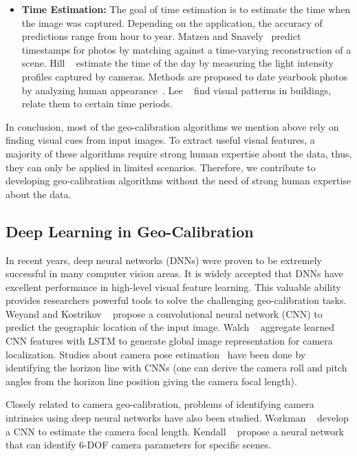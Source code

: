 \begin{itemize}[noitemsep]
\item \textbf{Time Estimation:}
The goal of time estimation is to estimate the time when the 
image was captured. Depending on the application, the accuracy of
predictions range from hour to year.
%
Matzen and Snavely~\cite{matzen2014scene} predict
timestamps for photos by matching against a time-varying
reconstruction of a scene.  Hill \etal~\cite{hill1994elephant} estimate the
time of the day by measuring the light intensity profiles captured by
cameras. Methods are proposed to date
yearbook photos by analyzing human
appearance~\cite{salem2016face2year,ginosar2015century}. Lee
\etal~\cite{linking2015iccp} find visual patterns in buildings,
relate them to certain time periods.
\newline

\end{itemize}

In conclusion, most of the geo-calibration algorithms we mention above
rely on finding visual cues from input images. To extract useful
visual features, a majority of these algorithms require strong human
expertise about the data, thus, they can only be applied in limited
scenarios. Therefore, we contribute to developing geo-calibration
algorithms without the need of strong human expertise about the data.

\subsection{Deep Learning in Geo-Calibration}
In recent years, deep neural networks (DNNs) were proven to be
extremely successful in many computer vision areas. 
It is widely accepted that DNNs have excellent performance in
high-level visual feature learning.
This valuable ability provides researchers powerful tools to
solve the challenging geo-calibration tasks.
Weyand and Kostrikov \etal~\cite{planet} propose a convolutional
neural network (CNN) to predict the geographic location of the input
image. Walch \etal~\cite{walch2017image} aggregate learned CNN
features with LSTM to generate global image representation for camera
localization.  Studies about camera pose
estimation~\cite{zhai2016horizon, workman2016horizon,
hold2017perceptual} have been done by identifying the horizon line with
CNNs (one can derive the camera roll and pitch angles from the horizon
line position giving the camera focal length).

Closely related to camera geo-calibration, problems of identifying
camera intrinsics using deep neural networks have also been studied.
Workman \etal~\cite{workman2015deepfocal} develop a CNN to estimate
the camera focal length. Kendall \etal~\cite{kendall2015convolutional}
propose a neural network that can identify 6-DOF camera parameters for
specific scenes.

